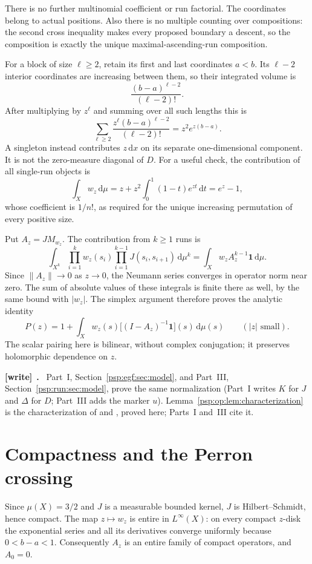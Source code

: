 \documentclass[11pt,letterpaper]{article}
\numberwithin{equation}{section}
\theoremstyle{remark}\newtheorem{remark}[theorem]{Remark}
\newcommand{\dd}{\,\mathrm d}
\newcommand{\one}{\mathbf1}
\newenvironment{writenote}[1][]{\par\smallskip\begingroup\small
 \noindent\textbf{[write]}\if\relax\detokenize{#1}\relax\else~\textbf{#1.}\fi\ }%
 {\par\endgroup\smallskip}
\begin{document}
There is no further multinomial coefficient or run factorial.
The coordinates belong to actual positions. Also there is no
multiple counting over compositions: the second cross inequality
makes every proposed boundary a descent, so the composition is
exactly the unique maximal-ascending-run composition.

For a block of size $\ell\geq2$, retain its first and last coordinates
$a<b$. Its $\ell-2$ interior coordinates are increasing between them,
so their integrated volume is
\[
 \frac{(b-a)^{\ell-2}}{(\ell-2)!}.
\]
After multiplying by $z^\ell$ and summing over all such lengths this is
\[
 \sum_{\ell\geq2}\frac{z^\ell(b-a)^{\ell-2}}{(\ell-2)!}
   =z^2e^{z(b-a)}.
\]
A singleton instead contributes $z\dd x$ on its separate
one-dimensional component. It is not the zero-measure diagonal of
$D$. For a useful check, the contribution of all single-run objects is
\begin{equation}\label{psp:op:eq:onerun}
 \int_Xw_z\dd\mu
   =z+z^2\int_0^1(1-t)e^{zt}\dd t=e^z-1,
\end{equation}
whose coefficient is $1/n!$, as required for the unique increasing
permutation of every positive size.

Put $A_z=JM_{w_z}$. The contribution from $k\geq1$ runs is
\[
 \int_{X^k}\prod_{i=1}^kw_z(s_i)
       \prod_{i=1}^{k-1}J(s_i,s_{i+1})\dd\mu^k
 =\int_X w_z A_z^{k-1}\one\dd\mu.
\]
Since $\|A_z\|\to0$ as $z\to0$, the Neumann series converges in
operator norm near zero. The sum of absolute values of these
integrals is finite there as well, by the same bound with $|w_z|$.
The simplex argument therefore proves the analytic identity
\begin{equation}\label{psp:op:eq:resolvent}
 P(z)=1+\int_Xw_z(s)\bigl[(I-A_z)^{-1}\one\bigr](s)\dd\mu(s)
 \qquad (|z|\text{ small}).
\end{equation}
The scalar pairing here is bilinear, without complex conjugation;
it preserves holomorphic dependence on $z$.
\begin{writenote}
Part~I, Section~\ref{psp:egf:sec:model}, and Part~III, Section~\ref{psp:run:sec:model}, prove the same normalization (Part~I writes $K$ for $J$ and $\Delta$ for $D$; Part~III adds the marker $u$). Lemma~\ref{psp:op:lem:characterization} is the characterization of \cite[Theorem~1]{abbhl} and \cite[Theorem~3]{abh}, proved here; Parts~I and~III cite it.
\end{writenote}

\section{Compactness and the Perron crossing}\label{psp:op:sec:perron}
Since $\mu(X)=3/2$ and $J$ is a measurable bounded kernel, $J$ is
Hilbert--Schmidt, hence compact. The map $z\mapsto w_z$ is entire in
$L^\infty(X)$: on every compact $z$-disk the exponential series and
all its derivatives converge uniformly because $0<b-a<1$.
Consequently $A_z$ is an entire family of compact operators, and
$A_0=0$.
\end{document}
